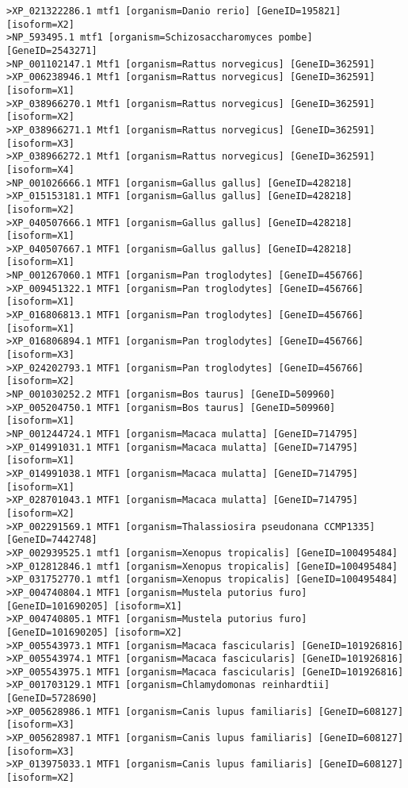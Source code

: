 \begin{lstlisting}[basicstyle=\tiny\ttfamily]
>XP_021322286.1 mtf1 [organism=Danio rerio] [GeneID=195821] [isoform=X2]
>NP_593495.1 mtf1 [organism=Schizosaccharomyces pombe] [GeneID=2543271]
>NP_001102147.1 Mtf1 [organism=Rattus norvegicus] [GeneID=362591]
>XP_006238946.1 Mtf1 [organism=Rattus norvegicus] [GeneID=362591] [isoform=X1]
>XP_038966270.1 Mtf1 [organism=Rattus norvegicus] [GeneID=362591] [isoform=X2]
>XP_038966271.1 Mtf1 [organism=Rattus norvegicus] [GeneID=362591] [isoform=X3]
>XP_038966272.1 Mtf1 [organism=Rattus norvegicus] [GeneID=362591] [isoform=X4]
>NP_001026666.1 MTF1 [organism=Gallus gallus] [GeneID=428218]
>XP_015153181.1 MTF1 [organism=Gallus gallus] [GeneID=428218] [isoform=X2]
>XP_040507666.1 MTF1 [organism=Gallus gallus] [GeneID=428218] [isoform=X1]
>XP_040507667.1 MTF1 [organism=Gallus gallus] [GeneID=428218] [isoform=X1]
>NP_001267060.1 MTF1 [organism=Pan troglodytes] [GeneID=456766]
>XP_009451322.1 MTF1 [organism=Pan troglodytes] [GeneID=456766] [isoform=X1]
>XP_016806813.1 MTF1 [organism=Pan troglodytes] [GeneID=456766] [isoform=X1]
>XP_016806894.1 MTF1 [organism=Pan troglodytes] [GeneID=456766] [isoform=X3]
>XP_024202793.1 MTF1 [organism=Pan troglodytes] [GeneID=456766] [isoform=X2]
>NP_001030252.2 MTF1 [organism=Bos taurus] [GeneID=509960]
>XP_005204750.1 MTF1 [organism=Bos taurus] [GeneID=509960] [isoform=X1]
>NP_001244724.1 MTF1 [organism=Macaca mulatta] [GeneID=714795]
>XP_014991031.1 MTF1 [organism=Macaca mulatta] [GeneID=714795] [isoform=X1]
>XP_014991038.1 MTF1 [organism=Macaca mulatta] [GeneID=714795] [isoform=X1]
>XP_028701043.1 MTF1 [organism=Macaca mulatta] [GeneID=714795] [isoform=X2]
>XP_002291569.1 MTF1 [organism=Thalassiosira pseudonana CCMP1335] [GeneID=7442748]
>XP_002939525.1 mtf1 [organism=Xenopus tropicalis] [GeneID=100495484]
>XP_012812846.1 mtf1 [organism=Xenopus tropicalis] [GeneID=100495484]
>XP_031752770.1 mtf1 [organism=Xenopus tropicalis] [GeneID=100495484]
>XP_004740804.1 MTF1 [organism=Mustela putorius furo] [GeneID=101690205] [isoform=X1]
>XP_004740805.1 MTF1 [organism=Mustela putorius furo] [GeneID=101690205] [isoform=X2]
>XP_005543973.1 MTF1 [organism=Macaca fascicularis] [GeneID=101926816]
>XP_005543974.1 MTF1 [organism=Macaca fascicularis] [GeneID=101926816]
>XP_005543975.1 MTF1 [organism=Macaca fascicularis] [GeneID=101926816]
>XP_001703129.1 MTF1 [organism=Chlamydomonas reinhardtii] [GeneID=5728690]
>XP_005628986.1 MTF1 [organism=Canis lupus familiaris] [GeneID=608127] [isoform=X3]
>XP_005628987.1 MTF1 [organism=Canis lupus familiaris] [GeneID=608127] [isoform=X3]
>XP_013975033.1 MTF1 [organism=Canis lupus familiaris] [GeneID=608127] [isoform=X2]

\end{lstlisting}
